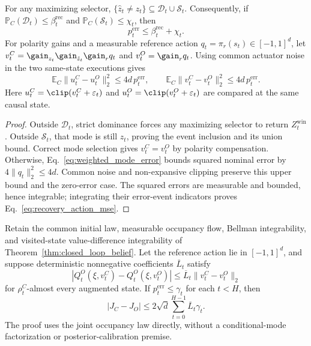 \begin{proposition}
\label{prop:recovery_action_error}
For any maximizing selector, $\{\hat z_t\ne z_t\}\subseteq\mathcal D_t\cup\mathcal S_t$.
Consequently, if $\mathbb P_C(\mathcal D_t)\le\beta_t^{\mathrm{rec}}$ and $\mathbb P_C(\mathcal S_t)\le\chi_t$, then
\begin{equation}
 p_t^{\mathrm{err}}\le\beta_t^{\mathrm{rec}}+\chi_t.
 \label{eq:recovery_current_mode_error}
\end{equation}
For polarity gains and a measurable reference action $q_t=\pi_r(s_t)\in[-1,1]^d$,
let $v_t^C=\gain_{z_t}\gain_{\hat z_t}\gain_rq_t$ and $v_t^O=\gain_rq_t$.
Using common actuator noise in the two same-state executions gives
\begin{equation}
 \mathbb E_C\|u_t^C-u_t^O\|_2^2
 \le4d\,p_t^{\mathrm{err}},\qquad
 \mathbb E_C\|v_t^C-v_t^O\|_2^2
 \le4d\,p_t^{\mathrm{err}}.
 \label{eq:recovery_action_mse}
\end{equation}
Here $u_t^C=\clip(v_t^C+\varepsilon_t)$ and $u_t^O=\clip(v_t^O+\varepsilon_t)$ are compared at the same causal state.
\end{proposition}

\begin{proof}
Outside $\mathcal D_t$, strict dominance forces any maximizing selector to return $Z_t^{\mathrm{win}}$.
Outside $\mathcal S_t$, that mode is still $z_t$, proving the event inclusion and its union bound.
Correct mode selection gives $v_t^C=v_t^O$ by polarity compensation.
Otherwise, Eq.~\eqref{eq:weighted_mode_error} bounds squared nominal error by $4\|q_t\|_2^2\le4d$.
Common noise and non-expansive clipping preserve this upper bound and the zero-error case.
The squared errors are measurable and bounded, hence integrable; integrating their error-event indicators proves Eq.~\eqref{eq:recovery_action_mse}.
\end{proof}

\begin{theorem}
\label{thm:recovery_return}
Retain the common initial law, measurable occupancy flow, Bellman integrability, and visited-state value-difference integrability of Theorem~\ref{thm:closed_loop_belief}.
Let the reference action lie in $[-1,1]^d$, and suppose deterministic nonnegative coefficients $\overline L_t$ satisfy
\begin{equation}
 |Q_t^O(\xi,v_t^C)-Q_t^O(\xi,v_t^O)|
 \le\overline L_t\|v_t^C-v_t^O\|_2
 \label{eq:uniform_causal_sensitivity}
\end{equation}
for $\rho_t^C$-almost every augmented state.
If $p_t^{\mathrm{err}}\le\gamma_t$ for each $t<H$, then
\begin{equation}
 |J_C-J_O|\le2\sqrt d\sum_{t=0}^{H-1}\overline L_t\gamma_t.
 \label{eq:recovery_return_loss}
\end{equation}
The proof uses the joint occupancy law directly, without a conditional-mode factorization or posterior-calibration premise.
\end{theorem}

